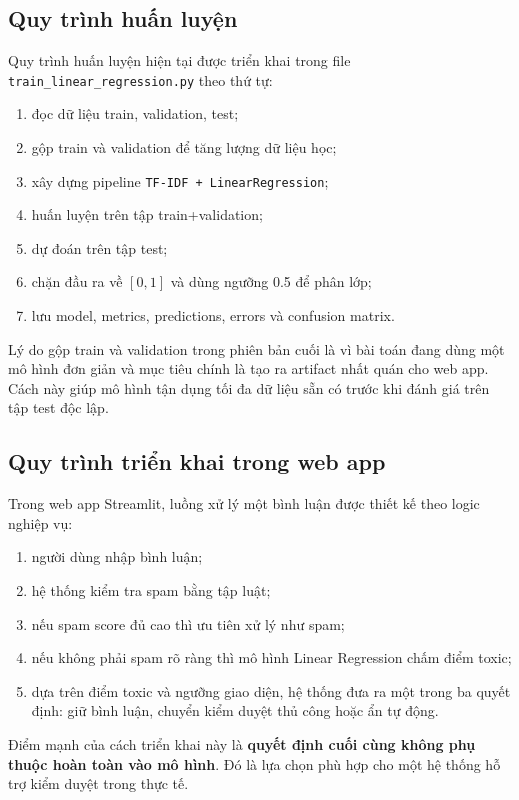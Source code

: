 \documentclass[12pt,a4paper]{article}
\begin{document}
\subsection{Quy trình huấn luyện}
Quy trình huấn luyện hiện tại được triển khai trong file \texttt{train\_linear\_regression.py} theo thứ tự:
\begin{enumerate}[leftmargin=1.2cm]
    \item đọc dữ liệu train, validation, test;
    \item gộp train và validation để tăng lượng dữ liệu học;
    \item xây dựng pipeline \texttt{TF-IDF + LinearRegression};
    \item huấn luyện trên tập train+validation;
    \item dự đoán trên tập test;
    \item chặn đầu ra về $[0,1]$ và dùng ngưỡng 0.5 để phân lớp;
    \item lưu model, metrics, predictions, errors và confusion matrix.
\end{enumerate}

Lý do gộp train và validation trong phiên bản cuối là vì bài toán đang dùng một mô hình đơn giản và mục tiêu chính là tạo ra artifact nhất quán cho web app. Cách này giúp mô hình tận dụng tối đa dữ liệu sẵn có trước khi đánh giá trên tập test độc lập.

\subsection{Quy trình triển khai trong web app}
Trong web app Streamlit, luồng xử lý một bình luận được thiết kế theo logic nghiệp vụ:
\begin{enumerate}[leftmargin=1.2cm]
    \item người dùng nhập bình luận;
    \item hệ thống kiểm tra spam bằng tập luật;
    \item nếu spam score đủ cao thì ưu tiên xử lý như spam;
    \item nếu không phải spam rõ ràng thì mô hình Linear Regression chấm điểm toxic;
    \item dựa trên điểm toxic và ngưỡng giao diện, hệ thống đưa ra một trong ba quyết định: giữ bình luận, chuyển kiểm duyệt thủ công hoặc ẩn tự động.
\end{enumerate}

Điểm mạnh của cách triển khai này là \textbf{quyết định cuối cùng không phụ thuộc hoàn toàn vào mô hình}. Đó là lựa chọn phù hợp cho một hệ thống hỗ trợ kiểm duyệt trong thực tế.
\end{document}
